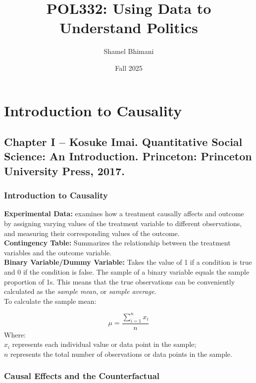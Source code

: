 \documentclass{article}
\title{POL332: Using Data to Understand Politics}
\author{Shamel Bhimani}
\date{Fall 2025}
\begin{document}
\maketitle

\tableofcontents
\newpage

\section{Introduction to Causality}

    \subsection{Chapter I -- Kosuke Imai. Quantitative Social Science: An Introduction. Princeton: Princeton University Press, 2017.}
    \subsubsection{Introduction to Causality}

    \noindent \textbf{Experimental Data:} examines how a treatment causally
affects and outcome by assigning varying values of the treatment variable to
different observations, and measuring their corresponding values of the
outcome.\\

    \noindent \textbf{Contingency Table:} Summarizes the relationship
between the treatment variables and the outcome variable.\\

    \noindent \textbf{Binary Variable/Dummy Variable:} Takes the value of 1
if a condition is true and 0 if the condition is false. The sample of a
binary variable equals the sample proportion of 1s. This means that the true
observations can be conveniently calculated as the \textit{sample mean}, or \textit{sample average}.\\

    To calculate the sample mean:

        \[
            \mu = \frac{\sum_{i=1}^{n} x_i}{n}
        \]
            Where:\\

$x_i$ represents each individual value or data point in the
sample;\\
    \indent $n$ represents the total number of observations or data points
in the sample.\\

\subsubsection{Causal Effects and the Counterfactual}
\end{document}
